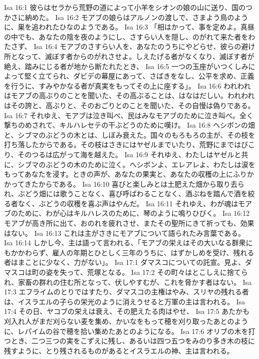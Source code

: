 Isa 16:1  彼らはセラから荒野の道によって小羊をシオンの娘の山に送り、国のつかさに納めた。
Isa 16:2  モアブの娘らはアルノンの渡しで、さまよう鳥のように、巣を追われたひなのようである。
Isa 16:3  「相はかって、事を定めよ。真昼の中でも、あなたの陰を夜のようにし、さすらい人を隠し、のがれて来た者をわたさず、
Isa 16:4  モアブのさすらい人を、あなたのうちにやどらせ、彼らの避け所となって、滅ぼす者からのがれさせよ。しえたげる者がなくなり、滅ぼす者が絶え、踏みにじる者が地から断たれたとき、
Isa 16:5  一つの玉座がいつくしみによって堅く立てられ、ダビデの幕屋にあって、さばきをなし、公平を求め、正義を行うに、すみやかなる者が真実をもってその上に座する」。
Isa 16:6  われわれはモアブの高ぶりのことを聞いた、その高ぶることは、はなはだしい。われわれはその誇と、高ぶりと、そのおごりとのことを聞いた、その自慢は偽りである。
Isa 16:7  それゆえ、モアブは泣き叫べ、民はみなモアブのために泣き叫べ。全く撃ちのめされて、キルハレセテの干ぶどうのために嘆け。
Isa 16:8  ヘシボンの畑と、シブマのぶどうの木とは、しぼみ衰えた。国々のもろもろの主が、その枝を打ち落したからである。その枝はさきにはヤゼルまでいたり、荒野にまではびこり、そのつるは広がって海を越えた。
Isa 16:9  それゆえ、わたしはヤゼルと共に、シブマのぶどうの木のために泣く。ヘシボンよ、エレアレよ、わたしは涙をもってあなたを浸す。ときの声が、あなたの果実と、あなたの収穫の上にふりかかってきたからである。
Isa 16:10  喜びと楽しみとは土肥えた畑から取り去られ、ぶどう畑には歌うことなく、喜び呼ばわることなく、酒ぶねを踏んで酒を絞る者なく、ぶどうの収穫を喜ぶ声はやんだ。
Isa 16:11  それゆえ、わが魂はモアブのために、わが心はキルハレスのために、琴のように鳴りひびく。
Isa 16:12  モアブが高き所に出て、おのれを疲れさせ、またその聖所にきて祈っても、効果はない。
Isa 16:13  これは主がさきにモアブについて語られたみ言葉である。
Isa 16:14  しかし今、主は語って言われる、「モアブの栄えはその大いなる群衆にもかかわらず、雇人の年期とひとしく三年のうちに、はずかしめを受け、残れる者はまことに少なく、力がない」。
Isa 17:1  ダマスコについての託宣。見よ、ダマスコは町の姿を失って、荒塚となる。
Isa 17:2  その町々はとこしえに捨てられ、家畜の群れの住む所となって、伏しやすむが、これを脅かす者はない。
Isa 17:3  エフライムのとりではすたり、ダマスコの主権はやみ、スリヤの残れる者は、イスラエルの子らの栄光のように消えうせると万軍の主は言われる。
Isa 17:4  その日、ヤコブの栄えは衰え、その肥えたる肉はやせ、
Isa 17:5  あたかも刈入れ人がまだ刈らない麦を集め、かいなをもって穂を刈り取ったあとのように、レパイムの谷で穂を拾い集めたあとのようになる。
Isa 17:6  オリブの木を打つとき、二つ三つの実をこずえに残し、あるいは四つ五つをみのり多き木の枝に残すように、とり残されるものがあるとイスラエルの神、主は言われる。
